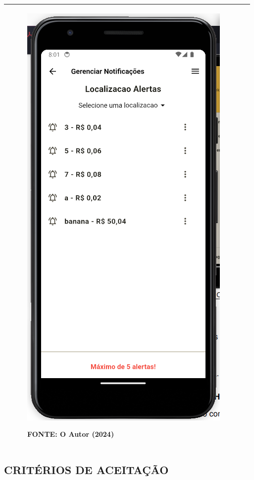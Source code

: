 \begin{tabular}{|ll|}
\begin{minipage}{0.48\textwidth}
\begin{figure}[H]
\includegraphics[width=.8\textwidth]{fig/telas/t_gerenciaralertas.png}
\footnotesize \centering
\par FONTE: O Autor (2024)
\end{figure}
\end{minipage}
 \\ \hline
\end{tabular}

\subsection*{\textbf{CRITÉRIOS DE ACEITAÇÃO}}

